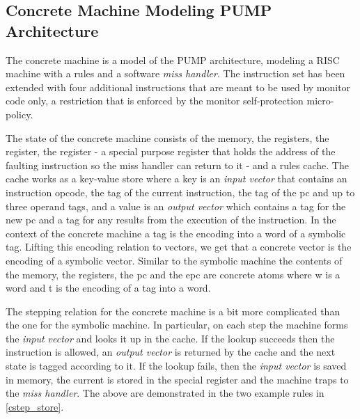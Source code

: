 \subsection{Concrete Machine Modeling PUMP Architecture}\label{sec:concrete}

The concrete machine is a model of the PUMP architecture, modeling a
RISC machine with a rules \cache and a software \emph{miss handler}.
The instruction set has been extended with four additional
instructions that are meant to be used by monitor code only, a
restriction that is enforced by the monitor self-protection
micro-policy.

The state of the concrete machine consists of the memory, the
registers, the \pc register, the \epc register - a special purpose
register that holds the address of the faulting instruction so the
miss handler can return to it - and a rules cache. The cache works as
a key-value store where a key is an \emph{input vector} that contains
an instruction opcode, the tag of the current instruction, the tag of
the pc and up to three operand tags, and a value is an \emph{output
  vector} which contains a tag for the new pc and a tag for any
results from the execution of the instruction. In the context of the
concrete machine a tag is the encoding into a word of a symbolic
tag. Lifting this encoding relation to vectors, we get that a concrete
vector is the encoding of a symbolic vector. Similar to the symbolic
machine the contents of the memory, the registers, the pc and the epc
are concrete atoms  where w is a word and t is the encoding
of a tag into a word.

The stepping relation for the concrete machine is a bit more
complicated than the one for the symbolic machine. In particular, on
each step the machine forms the \emph{input vector} and looks it up in
the cache. If the lookup succeeds then the instruction is allowed, an
\emph{output vector} is returned by the cache and the next state is
tagged according to it.  If the lookup fails, then the \emph{input
  vector} is saved in memory, the current \pc is stored in the special
register \epc and the machine traps to the \emph{miss handler}.  The
above are demonstrated in the two example rules in \cref{cstep_store}.

